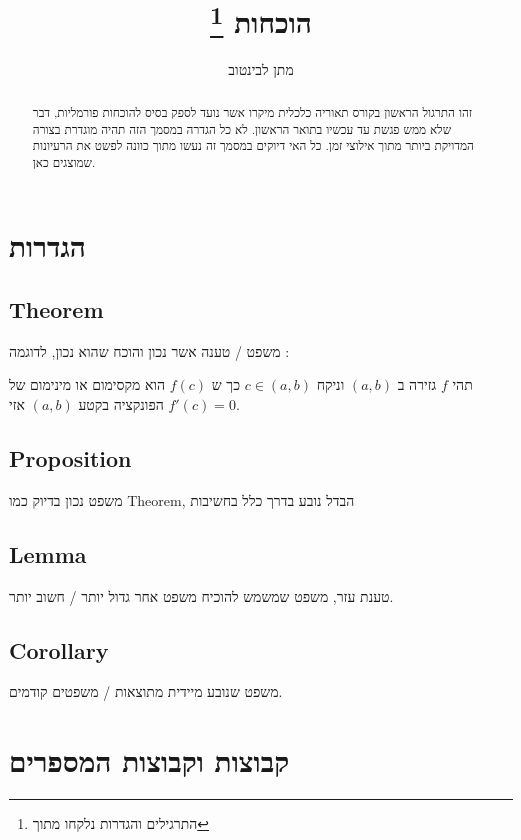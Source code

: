 \documentclass[a4paper,12pt]{article}
\title{הוכחות \footnote{התרגילים והגדרות נלקחו מתוך \te{Hammack, R (2013). Book of Proof}}}
\author{מתן לבינטוב}
\date{}
\newcommand{\te}[1]{\textenglish{#1}}
\begin{document}
\begin{RTL}
\maketitle
\begin{abstract}
זהו התרגול הראשון בקורס תאוריה כלכלית מיקרו אשר נועד לספק בסיס להוכחות פורמליות, דבר שלא ממש פגשת עד עכשיו בתואר הראשון. לא כל הגדרה במסמך הזה תהיה מוגדרת בצורה המדויקת ביותר מתוך אילוצי זמן. כל האי דיוקים במסמך זה נעשו מתוך כוונה לפשט את הרעיונות שמוצגים כאן.
\end{abstract}

\newpage
\tableofcontents
\newpage

\section{הגדרות}

\subsection{\te{Theorem}}
משפט / טענה אשר נכון והוכח שהוא נכון, לדוגמה :
\begin{theorem*}
תהי $f$ גזירה ב $(a,b)$ וניקח $c \in (a,b)$ כך ש $f(c)$ הוא מקסימום או מינימום של הפונקציה בקטע $(a,b)$ אזי $f'(c) = 0$.
\end{theorem*}


\subsection{\te{Proposition}}
משפט נכון בדיוק כמו \te{Theorem}, הבדל נובע בדרך כלל בחשיבות

\subsection{\te{Lemma}}
טענת עזר, משפט שמשמש להוכיח משפט אחר גדול יותר / חשוב יותר.

\subsection{\te{Corollary}}
משפט שנובע מיידית מתוצאות / משפטים קודמים.


\section{קבוצות וקבוצות המספרים}

\end{RTL}
\end{document}
